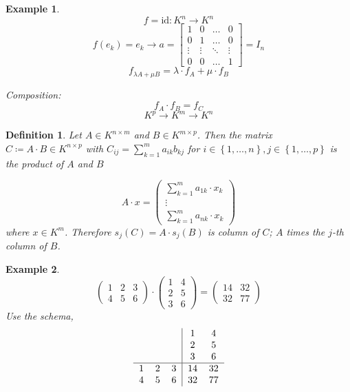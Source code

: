 \documentclass[a4paper,landscape,twocolumn]{article}
\newcommand\set[1]{\left\{#1\right\}}
\newtheorem{defi}{Definition}
\newtheorem{ex}{Example}
\begin{document}
\begin{ex}
  \[ f = \text{id}: K^n \rightarrow K^n \]
  \[
    f(e_k) = e_k \rightarrow a = \begin{bmatrix}
      1 & 0 & \ldots & 0 \\
      0 & 1 & \ldots & 0 \\
      \vdots & \vdots & \ddots & \vdots \\
      0 & 0 & \ldots & 1
    \end{bmatrix}
    = I_n
  \] \[
    f_{\lambda A + \mu B} = \lambda \cdot f_A + \mu \cdot f_B
  \]

  Composition:
  \[ f_A \cdot f_B = f_C \]
  \[ K^p \to K^m \to K^n \]
\end{ex}
%
\begin{defi}
  Let $A \in K^{n\times m}$ and $B \in K^{m\times p}$.
  Then the matrix $C \coloneqq A \cdot B \in K^{n\times p}$ with $C_{ij} = \sum_{k=1}^m a_{ik} b_{kj}$ for $i \in \set{1, \ldots, n}, j \in \set{1, \ldots, p}$ is the \emph{product of $A$ and $B$}

  \[
    A \cdot x = \begin{pmatrix}
      \sum_{k=1}^m a_{1k} \cdot x_k \\
      \vdots \\
      \sum_{k=1}^m a_{nk} \cdot x_k
    \end{pmatrix}
  \]
  where $x \in K^m$. Therefore $s_j(C) = A \cdot s_j(B)$ is column of $C$;
  $A$ times the $j$-th column of $B$.
\end{defi}
\begin{ex}
  \[
    \begin{pmatrix}
      1 & 2 & 3 \\
      4 & 5 & 6
    \end{pmatrix}
    \cdot
    \begin{pmatrix}
      1 & 4 \\
      2 & 5 \\
      3 & 6
    \end{pmatrix} =
    \begin{pmatrix}
      14 & 32 \\
      32 & 77
    \end{pmatrix}
  \]
  Use the schema,
  \[
    \begin{tabular}{ccc|cc}
       & & & 1 & 4 \\
       & & & 2 & 5 \\
       & & & 3 & 6 \\
      \hline
       1 & 2 & 3 & 14 & 32 \\
       4 & 5 & 6 & 32 & 77
    \end{tabular}
  \]
\end{ex}
\end{document}
